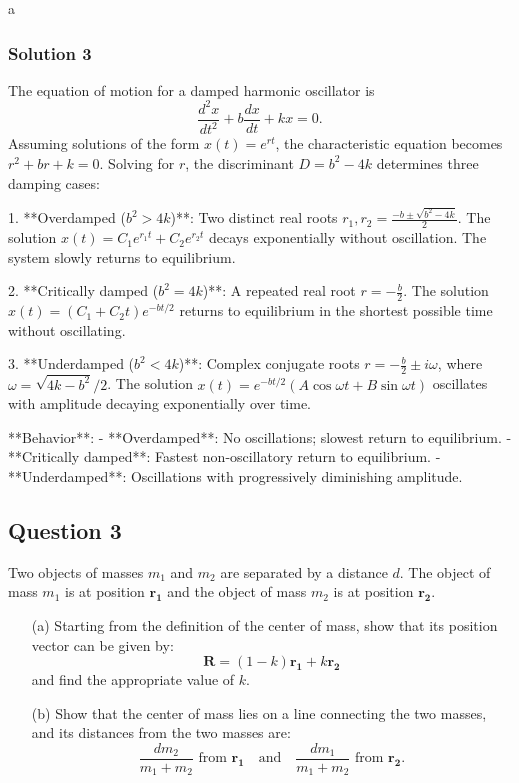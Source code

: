 \documentclass{article}
\begin{document}
a\subsubsection{Solution 3}
The equation of motion for a damped harmonic oscillator is \[ \frac{d^2x}{dt^2} + b\frac{dx}{dt} + kx = 0. \]  
Assuming solutions of the form \( x(t) = e^{rt} \), the characteristic equation becomes \( r^2 + br + k = 0 \). Solving for \( r \), the discriminant \( D = b^2 - 4k \) determines three damping cases:  

1. **Overdamped (\( b^2 > 4k \))**:  
   Two distinct real roots \( r_1, r_2 = \frac{-b \pm \sqrt{b^2 - 4k}}{2} \).  
   The solution \( x(t) = C_1e^{r_1 t} + C_2e^{r_2 t} \) decays exponentially without oscillation. The system slowly returns to equilibrium.  

2. **Critically damped (\( b^2 = 4k \))**:  
   A repeated real root \( r = -\frac{b}{2} \).  
   The solution \( x(t) = (C_1 + C_2 t)e^{-bt/2} \) returns to equilibrium in the shortest possible time without oscillating.  

3. **Underdamped (\( b^2 < 4k \))**:  
   Complex conjugate roots \( r = -\frac{b}{2} \pm i\omega \), where \( \omega = \sqrt{4k - b^2}/2 \).  
   The solution \( x(t) = e^{-bt/2}(A\cos\omega t + B\sin\omega t) \) oscillates with amplitude decaying exponentially over time.  

**Behavior**:  
- **Overdamped**: No oscillations; slowest return to equilibrium.  
- **Critically damped**: Fastest non-oscillatory return to equilibrium.  
- **Underdamped**: Oscillations with progressively diminishing amplitude.


\subsection{Question 3}

Two objects of masses $m_1$ and $m_2$ are separated by a distance $d$. The object of mass $m_1$ is at position $\mathbf{r_1}$ and the object of mass $m_2$ is at position $\mathbf{r_2}$.

\begin{itemize}
    \item[(a)] Starting from the definition of the center of mass, show that its position vector can be given by:
    \[
    \mathbf{R} = (1 - k)\mathbf{r_1} + k\mathbf{r_2}
    \]
    and find the appropriate value of $k$.
    
    \item[(b)] Show that the center of mass lies on a line connecting the two masses, and its distances from the two masses are:
    \[
    \frac{dm_2}{m_1 + m_2} \text{ from } \mathbf{r_1} \quad \text{and} \quad \frac{dm_1}{m_1 + m_2} \text{ from } \mathbf{r_2}.
    \]
\end{itemize}
\end{document}
